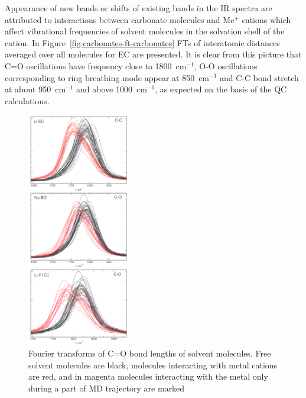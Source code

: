 Appearance of new bands or shifts of existing bands in the IR spectra are attributed to interactions between carbonate molecules and Me$^{+}$ cations which affect vibrational frequencies of solvent molecules in the solvation shell of the cation. In Figure~\ref{fig:carbonates-ft-carbonates} FTs of interatomic distances averaged over all molecules for EC are presented. It is clear from this picture that C=O oscillations have frequency close to 1800~cm$^{-1}$, O-O oscillations corresponding to ring breathing mode appear at 850~cm$^{-1}$ and C-C bond stretch at about 950~cm$^{-1}$ and above 1000~cm$^{-1}$, as expected on the basis of the QC calculations.

\begin{figure}[H]
    \centering
    \includegraphics[width=0.4\textwidth]{img/4-ir-spectra-from-aimd-simulations/3-carbonates/ft-c-o.png}
    \singlespacing
    \caption{Fourier transforms of C=O bond lengths of solvent molecules. Free solvent molecules are black, molecules interacting with metal cations are red, and in magenta molecules interacting with the metal only during a part of MD trajectory are marked}
    \label{fig:carbonates-ft-c-o}
\end{figure}

